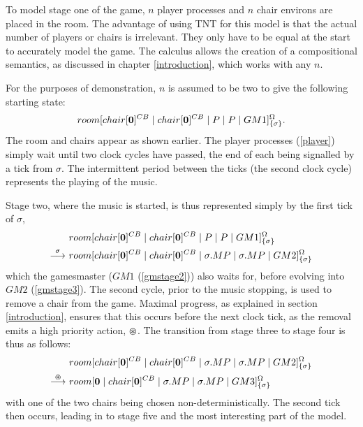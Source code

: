 To model stage one of the game, $n$ player processes and $n$ chair
environs are placed in the room.  The advantage of using TNT for this
model is that the actual number of players or chairs is irrelevant.
They only have to be equal at the start to accurately model the game.
The calculus allows the creation of a compositional semantics, as
discussed in chapter \ref{introduction}, which works with any $n$.

For the purposes of demonstration, $n$ is assumed to be two to give the
following starting state:
\begin{equation}
  {room}[ {chair}[ \textbf{0} ]^{CB} \;|\; {chair}[ \textbf{0} ]^{CB} \;|\; 
   P \;|\; P \;|\; GM1 ]^{\Omega}_{\{\sigma\}}.
\end{equation}
The room and chairs appear as shown earlier.  The player
processes (\ref{player}) simply wait until two clock
cycles have passed, the end of each being signalled by a tick from
$\sigma$.  The intermittent period between the ticks (the second clock
cycle) represents the playing of the music.  

Stage two, where the music is started, is thus represented simply by the
first tick of $\sigma$,
\begin{equation}
\begin{aligned}
  & {room}[ {chair}[ \textbf{0} ]^{CB} \;|\; {chair}[ \textbf{0} ]^{CB} \;|\; 
   P \;|\; P \;|\;
   GM1 ]^{\Omega}_{\{\sigma\}} \\
 \stackrel{\sigma}{\longrightarrow}\ & {room}[ {chair}[ \textbf{0} ]^{CB} \;|\; {chair}[ \textbf{0} ]^{CB} \;|\; 
   \sigma.MP \;|\; \sigma.MP \;|\;
   GM2 ]^{\Omega}_{\{\sigma\}}
\end{aligned}
\end{equation}
which the gamesmaster ($GM1$ (\ref{gmstage2})) also waits for, before
evolving into $GM2$ (\ref{gmstage3}).  The second cycle, prior to the
music stopping, is used to remove a chair from the game.  Maximal
progress, as explained in section \ref{introduction}, ensures that this
occurs before the next clock tick, as the removal emits a high priority
action, $\varoast$.  The transition from stage three to stage four is thus
as follows:
\begin{equation}
\begin{aligned}
& {room}[ {chair}[ \textbf{0} ]^{CB} \;|\; {chair}[ \textbf{0} ]^{CB} \;|\; 
   \sigma.MP \;|\; \sigma.MP \;|\;
   GM2 ]^{\Omega}_{\{\sigma\}} \\
 \stackrel{\varoast}{\longrightarrow}\ & {room}[ \textbf{0} \;|\; {chair}[ \textbf{0} ]^{CB} \;|\; 
   \sigma.MP \;|\; \sigma.MP \;|\;
   GM3 ]^{\Omega}_{\{\sigma\}}
\end{aligned}
\end{equation}
with one of the two chairs being chosen non-deterministically.
The second tick then occurs, leading in to stage five and the most
interesting part of the model.

